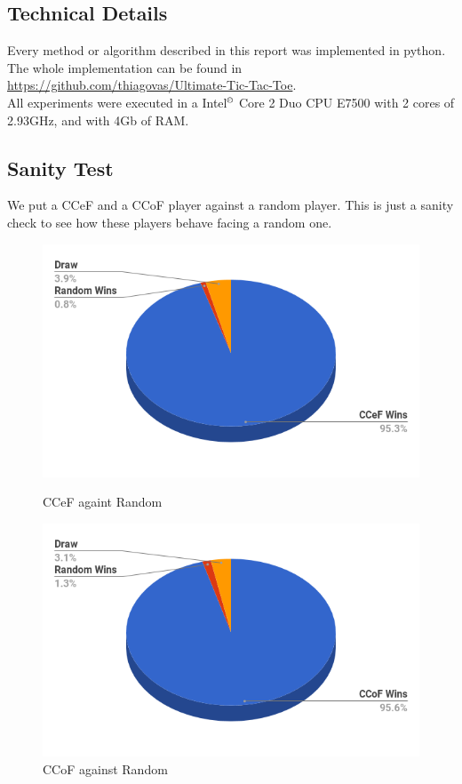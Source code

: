 \documentclass[10pt]{article}
\begin{document}
\subsection{Technical Details}
Every method or algorithm described in this report was implemented in python. The whole implementation can be found in \url{https://github.com/thiagovas/Ultimate-Tic-Tac-Toe}.\\
All experiments were executed in a Intel$^\copyright$ Core {\tiny\texttrademark} 2 Duo CPU E7500 with 2 cores of 2.93GHz, and with 4Gb of RAM.

\subsection{Sanity Test}
We put a CCeF and a CCoF player against a random player. This is just a sanity check to see how these players behave facing a random one.

\begin{figure}[h]
\centering
\begin{minipage}{.49\textwidth}
  \centering
  \includegraphics[width=.9\linewidth]{img/ccef-random.png}
  \caption{CCeF againt Random}
\end{minipage}%
\begin{minipage}{.49\textwidth}
  \centering
  \includegraphics[width=.9\linewidth]{img/ccof-random.png}
  \caption{CCoF against Random}
\end{minipage}
\end{figure}
\end{document}
